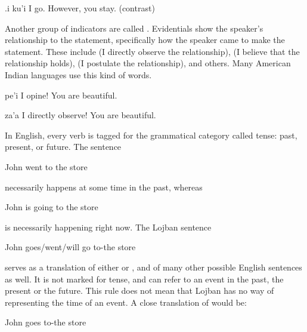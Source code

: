 \begin{example}
   .i ku'i   \n
I go.  However, you stay.  (contrast)
\end{example}

Another group of indicators are called . Evidentials show the speaker's relationship to the statement, specifically how the speaker came to make the statement. These include  (I directly observe the relationship),  (I believe that the relationship holds),  (I postulate the relationship), and others. Many American Indian languages use this kind of words.
\begin{example}
pe'i   \n
I opine!  You are beautiful.
\end{example}

\begin{example}
za'a   \n
I directly observe!  You are beautiful.
\end{example}



In English, every verb is tagged for the grammatical category called tense: past, present, or future. The sentence
\begin{example}
John went to the store
\end{example}

{\noindent}necessarily happens at some time in the past, whereas
\begin{example}
John is going to the store
\end{example}

{\noindent}is necessarily happening right now. The Lojban sentence
\begin{example}
   \n
John goes/went/will go to-the store
\end{example}

{\noindent}serves as a translation of either  or , and of many other possible English sentences as well. It is not marked for tense, and can refer to an event in the past, the present or the future. This rule does not mean that Lojban has no way of representing the time of an event. A close translation of  would be:
\begin{example}
  \n
John  goes to-the store
\end{example}

